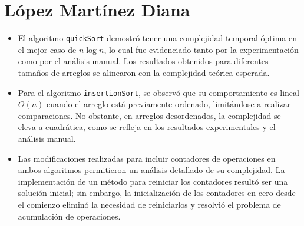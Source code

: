 \documentclass[12pt]{article}
\begin{document}
\section{López Martínez Diana}
\begin{itemize}
    \item El algoritmo \texttt{quickSort} demostró tener una complejidad temporal óptima en el mejor caso de $n \log n$, lo cual fue evidenciado tanto por la experimentación como por el análisis manual. Los resultados obtenidos para diferentes tamaños de arreglos se alinearon con la complejidad teórica esperada.
    \item Para el algoritmo \texttt{insertionSort}, se observó que su comportamiento es lineal $O(n)$ cuando el arreglo está previamente ordenado, limitándose a realizar comparaciones. No obstante, en arreglos desordenados, la complejidad se eleva a cuadrática, como se refleja en los resultados experimentales y el análisis manual.
    \item Las modificaciones realizadas para incluir contadores de operaciones en ambos algoritmos permitieron un análisis detallado de su complejidad. La implementación de un método para reiniciar los contadores resultó ser una solución inicial; sin embargo, la inicialización de los contadores en cero desde el comienzo eliminó la necesidad de reiniciarlos y resolvió el problema de acumulación de operaciones.
  \end{itemize}
  \par\vspace{0.6cm}
\end{document}
